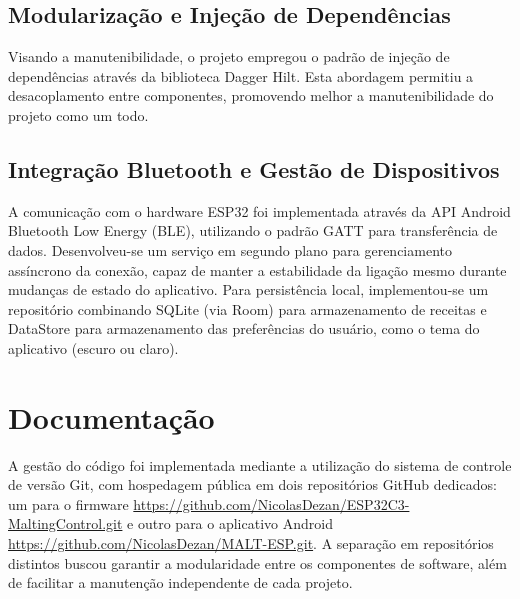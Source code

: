 \subsection{Modularização e Injeção de Dependências}

Visando a manutenibilidade, o projeto empregou o padrão de injeção de dependências através da biblioteca Dagger Hilt. Esta abordagem permitiu a desacoplamento entre componentes, promovendo melhor a manutenibilidade do projeto como um todo. 

\subsection{Integração Bluetooth e Gestão de Dispositivos}

A comunicação com o hardware ESP32 foi implementada através da API Android Bluetooth Low Energy (BLE), utilizando o padrão GATT para transferência de dados. Desenvolveu-se um serviço em segundo plano para gerenciamento assíncrono da conexão, capaz de manter a estabilidade da ligação mesmo durante mudanças de estado do aplicativo. Para persistência local, implementou-se um repositório combinando SQLite (via Room) para armazenamento de receitas e DataStore para armazenamento das preferências do usuário, como o tema do aplicativo (escuro ou claro).



\section{Documentação}
A gestão do código foi implementada mediante a utilização do sistema de controle de versão Git, com hospedagem pública em dois repositórios GitHub dedicados: um para o firmware \url{https://github.com/NicolasDezan/ESP32C3-MaltingControl.git} e outro para o aplicativo Android \url{https://github.com/NicolasDezan/MALT-ESP.git}. A separação em repositórios distintos buscou garantir a modularidade entre os componentes de software, além de facilitar a manutenção independente de cada projeto.

